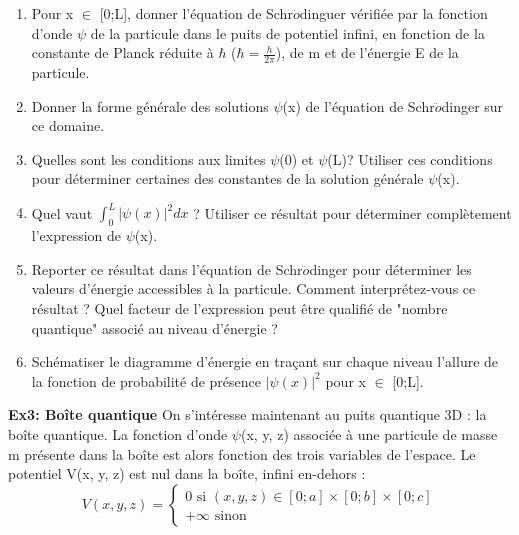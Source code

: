 \documentclass{article}
\begin{document}
\begin{enumerate}
    \item Pour x $\in$ [0;L], donner l'équation de Schr$\ddot{o}$dinguer vérifiée par la fonction d'onde $\psi$ de la particule dans le puits de potentiel infini, en fonction de la constante de Planck réduite à $\hbar$ ($\hbar = \frac{h}{2\pi}$), de m et de l'énergie E de la particule.
    \item Donner la forme générale des solutions $\psi$(x) de l'équation de Schr$\ddot{o}$dinger sur ce domaine.
    \item Quelles sont les conditions aux limites $\psi$(0) et $\psi$(L)? Utiliser ces conditions pour déterminer certaines des constantes de la solution générale $\psi$(x).
    \item Quel vaut $\int_{0}^{L} |\psi(x)|^{2}dx$ ? Utiliser ce résultat pour déterminer complètement l'expression de $\psi$(x).
    \item Reporter ce résultat dans l’équation de Schr$\ddot{o}$dinger pour déterminer les valeurs d’énergie accessibles à la particule. Comment interprétez-vous ce résultat ? Quel facteur de l’expression peut être qualifié de "nombre quantique" associé au niveau d’énergie ?
    \item Schématiser le diagramme d’énergie en traçant sur chaque niveau l’allure de la fonction de probabilité de présence $|\psi(x)|^{2}$ pour x $\in$ [0;L].
\end{enumerate}

\noindent\textbf{Ex3: Boîte quantique}\newline
On s’intéresse maintenant au puits quantique 3D : la boîte quantique. La fonction d’onde $\psi$(x, y, z) associée à une particule de masse m présente dans la boîte est alors fonction des trois variables de l’espace. Le potentiel V(x, y, z) est nul dans la boîte, infini en-dehors :
\[ V(x,y,z)= \left\{
    \begin{array}{c}
        0 \text{ si } (x,y,z) \in [0;a] \times [0;b] \times [0;c] \\
        +\infty \text{ sinon}
    \end{array}
\]
\end{document}
